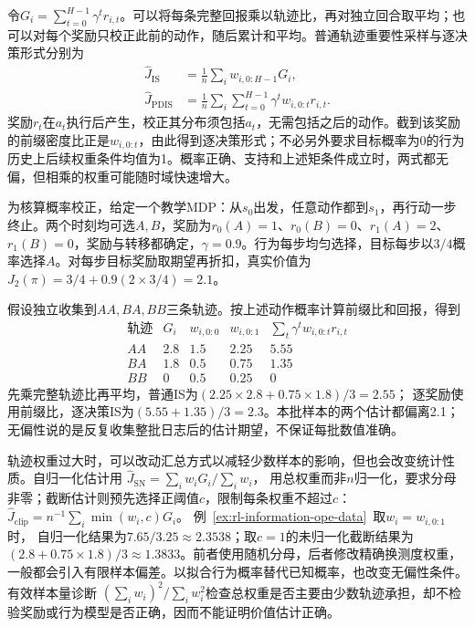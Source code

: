 令$G_i=\sum_{t=0}^{H-1}\gamma^t r_{i,t}$。可以将每条完整回报乘以轨迹比，再对独立回合取平均；也可以对每个奖励只校正此前的动作，随后累计和平均。普通轨迹重要性采样与逐决策形式分别为
\begin{align}
  \label{eq:rl-information-is}
  \widehat J_{\mathrm{IS}}
    &=\frac1n\sum_iw_{i,0:H-1}G_i,\nonumber\\
  \widehat J_{\mathrm{PDIS}}
    &=\frac1n\sum_i\sum_{t=0}^{H-1}
                      \gamma^t w_{i,0:t}r_{i,t}.
\end{align}
奖励$r_t$在$a_t$执行后产生，校正其分布须包括$a_t$，无需包括之后的动作。截到该奖励的前缀密度比正是$w_{i,0:t}$，由此得到逐决策形式；不必另外要求目标概率为0的行为历史上后续权重条件均值为1。概率正确、支持和上述矩条件成立时，两式都无偏，但相乘的权重可能随时域快速增大。

\begin{example}[三条两步轨迹的概率校正]
  \label{ex:rl-information-ope-data}
  为核算概率校正，给定一个教学MDP：从$s_0$出发，任意动作都到$s_1$，再行动一步终止。两个时刻均可选$A,B$，奖励为$r_0(A)=1$、$r_0(B)=0$、$r_1(A)=2$、$r_1(B)=0$，奖励与转移都确定，$\gamma=0.9$。行为每步均匀选择，目标每步以$3/4$概率选择$A$。对每步目标奖励取期望再折扣，真实价值为
  $J_2(\pi)=3/4+0.9(2\times3/4)=2.1$。

  假设独立收集到$AA,BA,BB$三条轨迹。按上述动作概率计算前缀比和回报，得到
  \[
  \begin{array}{c|rrrr}
    \text{轨迹}&G_i&w_{i,0:0}&w_{i,0:1}
                    &\sum_t\gamma^t w_{i,0:t}r_{i,t}\\
    \hline
    AA&2.8&1.5&2.25&5.55\\
    BA&1.8&0.5&0.75&1.35\\
    BB&0&0.5&0.25&0
  \end{array}
  \]
  先乘完整轨迹比再平均，普通IS为$(2.25\times2.8+0.75\times1.8)/3=2.55$；
  逐奖励使用前缀比，逐决策IS为$(5.55+1.35)/3=2.3$。本批样本的两个估计都偏离2.1；无偏性说的是反复收集整批日志后的估计期望，不保证每批数值准确。
\end{example}

轨迹权重过大时，可以改动汇总方式以减轻少数样本的影响，但也会改变统计性质。自归一化估计用
$\widehat J_{\mathrm{SN}}=\sum_iw_iG_i/\sum_iw_i$，
用总权重而非$n$归一化，要求分母非零；截断估计则预先选择正阈值$c$，限制每条权重不超过$c$：
$\widehat J_{\mathrm{clip}}=n^{-1}\sum_i\min(w_i,c)G_i$。
例~\ref{ex:rl-information-ope-data}~取$w_i=w_{i,0:1}$时，
自归一化结果为$7.65/3.25\approx2.3538$；取$c=1$的未归一化截断结果为
$(2.8+0.75\times1.8)/3\approx1.3833$。前者使用随机分母，后者修改精确换测度权重，一般都会引入有限样本偏差。以拟合行为概率替代已知概率，也改变无偏性条件。有效样本量诊断
$(\sum_iw_i)^2/\sum_iw_i^2$检查总权重是否主要由少数轨迹承担，却不检验奖励或行为模型是否正确，因而不能证明价值估计正确。

